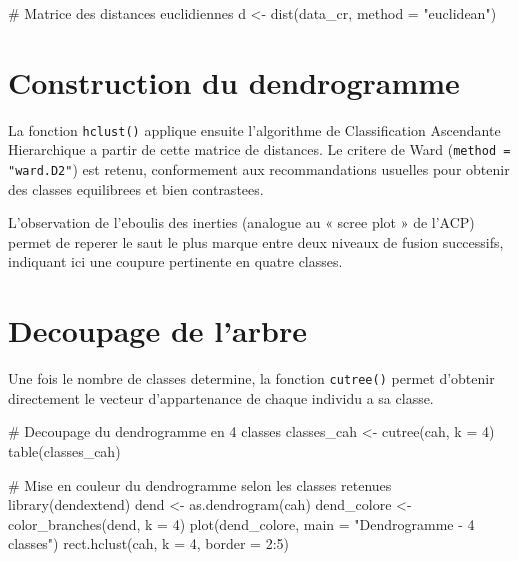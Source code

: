 \documentclass[12pt,a4paper]{book}
\begin{document}
	\begin{Rscript}
		# Matrice des distances euclidiennes
		d <- dist(data_cr, method = "euclidean")
	\end{Rscript}
	
	\section{Construction du dendrogramme}
	
	La fonction \texttt{hclust()} applique ensuite l'algorithme de Classification Ascendante Hierarchique a partir de cette matrice de distances. Le critere de Ward (\texttt{method = "ward.D2"}) est retenu, conformement aux recommandations usuelles pour obtenir des classes equilibrees et bien contrastees.
	
	
	L'observation de l'eboulis des inerties (analogue au « scree plot » de l'ACP) permet de reperer le saut le plus marque entre deux niveaux de fusion successifs, indiquant ici une coupure pertinente en quatre classes.
	
	\section{Decoupage de l'arbre}
	
	Une fois le nombre de classes determine, la fonction \texttt{cutree()} permet d'obtenir directement le vecteur d'appartenance de chaque individu a sa classe.
	
	\begin{Rscript}
		# Decoupage du dendrogramme en 4 classes
		classes_cah <- cutree(cah, k = 4)
		table(classes_cah)
		
		# Mise en couleur du dendrogramme selon les classes retenues
		library(dendextend)
		dend <- as.dendrogram(cah)
		dend_colore <- color_branches(dend, k = 4)
		plot(dend_colore, main = "Dendrogramme - 4 classes")
		rect.hclust(cah, k = 4, border = 2:5)
	\end{Rscript}
	
\end{document}
